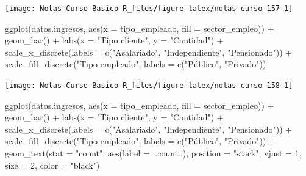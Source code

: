 \documentclass[
  12pt,
]{book}
\newenvironment{Shaded}{\begin{snugshade}}{\end{snugshade}}
\newcommand{\AttributeTok}[1]{\textcolor[rgb]{0.77,0.63,0.00}{#1}}
\newcommand{\DecValTok}[1]{\textcolor[rgb]{0.00,0.00,0.81}{#1}}
\newcommand{\FunctionTok}[1]{\textcolor[rgb]{0.00,0.00,0.00}{#1}}
\newcommand{\NormalTok}[1]{#1}
\newcommand{\SpecialCharTok}[1]{\textcolor[rgb]{0.00,0.00,0.00}{#1}}
\newcommand{\StringTok}[1]{\textcolor[rgb]{0.31,0.60,0.02}{#1}}
\begin{document}
\begin{center}\texttt{[image: Notas-Curso-Basico-R\_files/figure-latex/notas-curso-157-1]} \end{center}

\begin{Shaded}
\begin{Highlighting}[]
\FunctionTok{ggplot}\NormalTok{(datos.ingresos, }\FunctionTok{aes}\NormalTok{(}\AttributeTok{x =}\NormalTok{ tipo\_empleado, }\AttributeTok{fill =}\NormalTok{ sector\_empleo))  }\SpecialCharTok{+}
  \FunctionTok{geom\_bar}\NormalTok{() }\SpecialCharTok{+}
  \FunctionTok{labs}\NormalTok{(}\AttributeTok{x =} \StringTok{"Tipo cliente"}\NormalTok{, }\AttributeTok{y =} \StringTok{"Cantidad"}\NormalTok{) }\SpecialCharTok{+}
  \FunctionTok{scale\_x\_discrete}\NormalTok{(}\AttributeTok{labels =} \FunctionTok{c}\NormalTok{(}\StringTok{"Asalariado"}\NormalTok{, }\StringTok{"Independiente"}\NormalTok{, }\StringTok{"Pensionado"}\NormalTok{)) }\SpecialCharTok{+}
  \FunctionTok{scale\_fill\_discrete}\NormalTok{(}\StringTok{"Tipo empleado"}\NormalTok{,}
    \AttributeTok{labels =} \FunctionTok{c}\NormalTok{(}\StringTok{"Público"}\NormalTok{, }\StringTok{"Privado"}\NormalTok{))}
\end{Highlighting}
\end{Shaded}

\begin{center}\texttt{[image: Notas-Curso-Basico-R\_files/figure-latex/notas-curso-158-1]} \end{center}

\begin{Shaded}
\begin{Highlighting}[]
\FunctionTok{ggplot}\NormalTok{(datos.ingresos, }\FunctionTok{aes}\NormalTok{(}\AttributeTok{x =}\NormalTok{ tipo\_empleado, }\AttributeTok{fill =}\NormalTok{ sector\_empleo))  }\SpecialCharTok{+}
  \FunctionTok{geom\_bar}\NormalTok{() }\SpecialCharTok{+}
  \FunctionTok{labs}\NormalTok{(}\AttributeTok{x =} \StringTok{"Tipo cliente"}\NormalTok{, }\AttributeTok{y =} \StringTok{"Cantidad"}\NormalTok{) }\SpecialCharTok{+}
  \FunctionTok{scale\_x\_discrete}\NormalTok{(}\AttributeTok{labels =} \FunctionTok{c}\NormalTok{(}\StringTok{"Asalariado"}\NormalTok{, }\StringTok{"Independiente"}\NormalTok{, }\StringTok{"Pensionado"}\NormalTok{)) }\SpecialCharTok{+}
  \FunctionTok{scale\_fill\_discrete}\NormalTok{(}\StringTok{"Tipo empleado"}\NormalTok{,}
    \AttributeTok{labels =} \FunctionTok{c}\NormalTok{(}\StringTok{"Público"}\NormalTok{, }\StringTok{"Privado"}\NormalTok{)) }\SpecialCharTok{+}
  \FunctionTok{geom\_text}\NormalTok{(}\AttributeTok{stat =} \StringTok{"count"}\NormalTok{, }\FunctionTok{aes}\NormalTok{(}\AttributeTok{label =}\NormalTok{ ..count..),}
    \AttributeTok{position =} \StringTok{"stack"}\NormalTok{,}
    \AttributeTok{vjust =} \DecValTok{1}\NormalTok{,}
    \AttributeTok{size =} \DecValTok{2}\NormalTok{,}
    \AttributeTok{color =} \StringTok{"black"}\NormalTok{)}
\end{Highlighting}
\end{Shaded}
\end{document}
